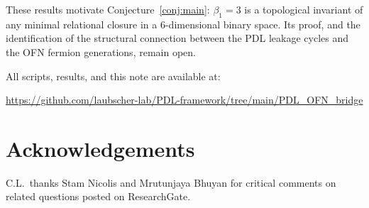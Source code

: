 \documentclass[11pt,a4paper]{article}
\begin{document}
These results motivate Conjecture~\ref{conj:main}: $\beta_1 = 3$ is a topological invariant of any minimal relational closure in a 6-dimensional binary space. Its proof, and the identification of the structural connection between the PDL leakage cycles and the OFN fermion generations, remain open.

All scripts, results, and this note are available at:
\begin{center}
\url{https://github.com/laubscher-lab/PDL-framework/tree/main/PDL_OFN_bridge}
\end{center}

\section*{Acknowledgements}
C.L.\ thanks Stam Nicolis and Mrutunjaya Bhuyan for critical comments on related questions posted on ResearchGate. 
\end{document}
